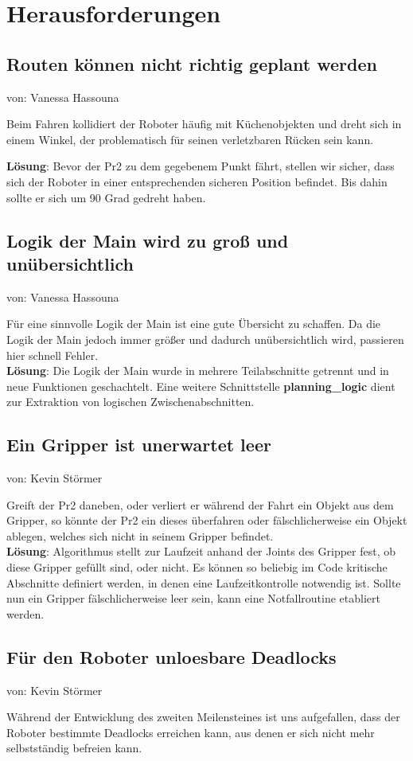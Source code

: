 \documentclass{suturo}
\makeatletter
\newcommand{\chapterauthor}[1]{%
  {\parindent0pt\vspace*{-27pt}%
  \linespread{0}\small\begin{flushright}von: #1\end{flushright}%
  \par\nobreak\vspace*{0pt}}
  \@afterheading%
}
\makeatother
\begin{document}
\section{Herausforderungen}
\subsection{Routen können nicht richtig geplant werden}
\chapterauthor{Vanessa Hassouna}
Beim Fahren kollidiert der Roboter häufig mit Küchenobjekten und dreht sich in einem Winkel, der problematisch für seinen verletzbaren Rücken sein kann.

\textbf{Lösung}: Bevor der Pr2 zu dem gegebenem Punkt fährt, stellen wir sicher, dass sich der Roboter in einer entsprechenden sicheren Position befindet. Bis dahin sollte er sich um 90 Grad gedreht haben.


\subsection{Logik der Main wird zu groß und unübersichtlich}
\chapterauthor{Vanessa Hassouna}
Für eine sinnvolle Logik der Main ist eine gute Übersicht zu schaffen. Da die Logik der Main jedoch immer größer und dadurch unübersichtlich wird, passieren hier schnell Fehler.\\

\textbf{Lösung}: Die Logik der Main wurde in mehrere Teilabschnitte getrennt und in neue Funktionen geschachtelt. Eine weitere Schnittstelle \textbf{planning\_logic} dient zur Extraktion von logischen Zwischenabschnitten.


\subsection{Ein Gripper ist unerwartet leer}
\chapterauthor{Kevin Störmer}
Greift der Pr2 daneben, oder verliert er während der Fahrt ein Objekt aus dem Gripper, so könnte der Pr2 ein dieses überfahren oder fälschlicherweise ein Objekt ablegen, welches sich nicht in seinem Gripper befindet.\\

\textbf{Lösung}: Algorithmus stellt zur Laufzeit anhand der Joints des Gripper fest, ob diese Gripper gefüllt sind, oder nicht. Es können so beliebig im Code kritische Abschnitte definiert werden, in denen eine Laufzeitkontrolle notwendig ist. Sollte nun ein Gripper fälschlicherweise leer sein, kann eine Notfallroutine etabliert werden.

\subsection{Für den Roboter unloesbare Deadlocks}
\chapterauthor{Kevin Störmer}
Während der Entwicklung des zweiten Meilensteines ist uns aufgefallen, dass der Roboter bestimmte Deadlocks erreichen kann, aus denen er sich nicht mehr selbstständig befreien kann.\\
\end{document}
